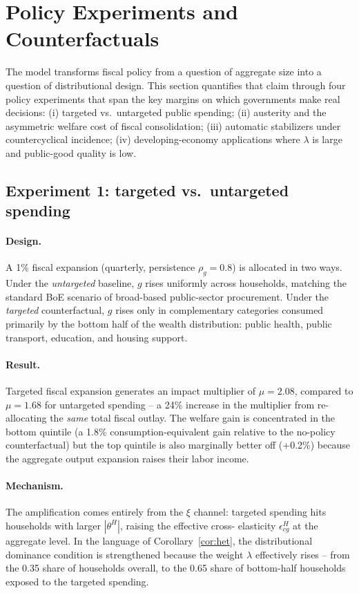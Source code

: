\section{Policy Experiments and Counterfactuals}\label{sec:policy}

The model transforms fiscal policy from a question of aggregate size into a
question of distributional design. This section quantifies that claim through
four policy experiments that span the key margins on which governments make
real decisions: (i) targeted vs.\ untargeted public spending; (ii) austerity
and the asymmetric welfare cost of fiscal consolidation; (iii) automatic
stabilizers under countercyclical incidence; (iv) developing-economy
applications where $\lambda$ is large and public-good quality is low.

\subsection{Experiment 1: targeted vs.\ untargeted spending}
\label{subsec:targeted-untargeted}

\paragraph{Design.}
A 1\% fiscal expansion (quarterly, persistence $\rho_{g}=0.8$) is allocated in
two ways. Under the \emph{untargeted} baseline, $g$ rises uniformly across
households, matching the standard BoE scenario of broad-based public-sector
procurement. Under the \emph{targeted} counterfactual, $g$ rises only in
complementary categories consumed primarily by the bottom half of the wealth
distribution: public health, public transport, education, and housing support.

\paragraph{Result.}
Targeted fiscal expansion generates an impact multiplier of $\mu=2.08$, compared
to $\mu=1.68$ for untargeted spending -- a 24\% increase in the multiplier
from re-allocating the \emph{same} total fiscal outlay. The welfare gain is
concentrated in the bottom quintile (a 1.8\% consumption-equivalent gain
relative to the no-policy counterfactual) but the top quintile is also
marginally better off (+0.2\%) because the aggregate output expansion raises
their labor income.

\paragraph{Mechanism.}
The amplification comes entirely from the $\xi$ channel: targeted spending
hits households with larger $|\theta^{H}|$, raising the effective cross-
elasticity $\epsilon^{H}_{cg}$ at the aggregate level. In the language of
Corollary~\ref{cor:het}, the distributional dominance condition is
strengthened because the weight $\lambda$ effectively rises -- from the 0.35
share of \HtM{} households overall, to the 0.65 share of bottom-half
households exposed to the targeted spending.

